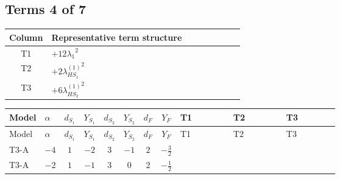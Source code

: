 \documentclass[8pt]{article}
\begin{document}
\begin{landscape}
\subsection*{Terms 4 of 7}
\begin{center}
\begin{tabular}{@{}c >{\raggedright\arraybackslash}p{0.82\linewidth}@{}}
\toprule
Column & Representative term structure \\
\midrule
T1 & \(\displaystyle +12 {\lambda_1}^2\) \\
\midrule
T2 & \(\displaystyle +2 {\lambda_{HS_1}^{(1)}}^2\) \\
\midrule
T3 & \(\displaystyle +6 {\lambda_{HS_2}^{(1)}}^2\) \\
\midrule
\bottomrule
\end{tabular}
\end{center}
\smallskip
\tiny
\begin{longtable}{@{}llcccccc >{\raggedright\arraybackslash}p{0.21\linewidth} >{\raggedright\arraybackslash}p{0.21\linewidth} >{\raggedright\arraybackslash}p{0.21\linewidth}@{}}
\toprule
Model & $\alpha$ & $d_{S_1}$ & $Y_{S_1}$ & $d_{S_2}$ & $Y_{S_2}$ & $d_F$ & $Y_F$ & T1 & T2 & T3 \\
\midrule
\endfirsthead
\toprule
Model & $\alpha$ & $d_{S_1}$ & $Y_{S_1}$ & $d_{S_2}$ & $Y_{S_2}$ & $d_F$ & $Y_F$ & T1 & T2 & T3 \\
\midrule
\endhead
T3-A & $-4$ & $1$ & $-2$ & $3$ & $-1$ & $2$ & $-\frac{3}{2}$ & \scriptsize\adjustbox{max width=\linewidth}{$\begin{gathered} +12 {\lambda_1}^2\end{gathered}$} & \scriptsize\adjustbox{max width=\linewidth}{$\begin{gathered} +2 {\lambda_{HS_1}^{(1)}}^2\end{gathered}$} & \scriptsize\adjustbox{max width=\linewidth}{$\begin{gathered} +6 {\lambda_{HS_2}^{(1)}}^2\end{gathered}$} \\
\midrule
T3-A & $-2$ & $1$ & $-1$ & $3$ & $0$ & $2$ & $-\frac{1}{2}$ & \scriptsize\adjustbox{max width=\linewidth}{$\begin{gathered} +12 {\lambda_1}^2\end{gathered}$} & \scriptsize\adjustbox{max width=\linewidth}{$\begin{gathered} +2 {\lambda_{HS_1}^{(1)}}^2\end{gathered}$} & \scriptsize\adjustbox{max width=\linewidth}{$\begin{gathered} +6 {\lambda_{HS_2}^{(1)}}^2\end{gathered}$} \\

\end{longtable}
\end{landscape}
\end{document}
